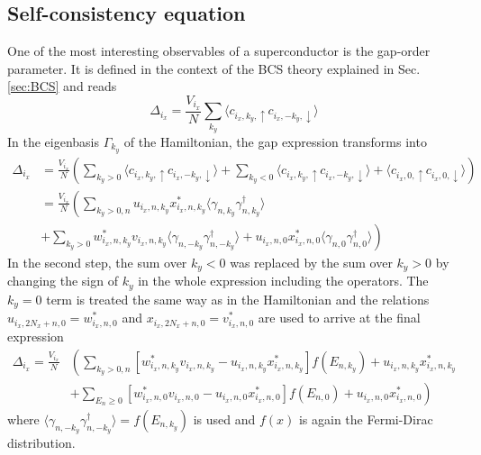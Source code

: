 \subsection{Self-consistency equation}\label{sec:num_gap}
One of the most interesting observables of a superconductor is the gap-order parameter.
It is defined in the context of the BCS theory explained in Sec. \ref{sec:BCS} and reads
\begin{equation}
    \nonumber
    \Delta_{i_x} = \frac{V_{i_x}}{N} \sum_{k_y} \langle c_{i_x, k_y, \uparrow}c_{i_x, -k_y, \downarrow}\rangle
\end{equation}
In the eigenbasis $\Gamma_{k_y}$ of the Hamiltonian, the gap expression transforms into
\begin{align} \nonumber
    \Delta_{i_x} &= \frac{V_{i_x}}{N}\left( \sum_{k_y >0} \langle c_{i_x, k_y, \uparrow}c_{i_x, -k_y, \downarrow}\rangle  +\sum_{k_y <0} \langle c_{i_x, k_y, \uparrow}c_{i_x, -k_y, \downarrow}\rangle + \langle c_{i_x,0, \uparrow}c_{i_x, 0, \downarrow}\rangle \right) \\ \nonumber
    &= \frac{V_{i_x}}{N}\left( \sum_{k_y >0,n} u_{i_x,n,k_y}x^*_{i_x,n,k_y}\langle \gamma_{n, k_y}\gamma^{\dag}_{n, k_y}\rangle  \right. \\ \nonumber
    &\left.+\sum_{k_y >0} w^*_{i_x,n,k_y}v_{i_x,n,k_y}\langle \gamma_{n, -k_y}\gamma^{\dag}_{n, -k_y}\rangle + u_{i_x,n,0}x^*_{i_x,n,0}\langle \gamma_{n, 0}\gamma^{\dag}_{n, 0}\rangle \right)
\end{align}
In the second step, the sum over $k_y<0$ was replaced by the sum over $k_y>0$ by changing the sign of $k_y$ in the whole expression including the operators.
The $k_y=0$ term is treated the same way as in the Hamiltonian and the relations $u_{i_x,2N_x+n,0} = w^*_{i_x, n,0}$ and $x_{i_x,2N_x+n,0} = v^*_{i_x, n,0}$ are used to arrive at the final expression
\begin{align} \nonumber
    \Delta_{i_x} = \frac{V_{i_x}}{N} &\left( \sum_{k_y >0,n} \left[ w^*_{i_x,n,k_y}v_{i_x,n,k_y}-u_{i_x,n,k_y}x^*_{i_x,n,k_y}\right]f(E_{n,k_y}) +u_{i_x,n,k_y}x^*_{i_x,n,k_y} \right. \\
    &+ \left.\sum_{E_n \geq0} \left[ w^*_{i_x,n,0}v_{i_x,n,0}-u_{i_x,n,0}x^*_{i_x,n,0}\right]f(E_{n,0})+ u_{i_x,n,0}x^*_{i_x,n,0} \right) \label{eq:gap_singlet_num}
\end{align}
where $\langle \gamma_{n, -k_y}\gamma^{\dag}_{n, -k_y}\rangle=f(E_{n,k_y})$ is used and $f(x)$ is again the Fermi-Dirac distribution. \newline
